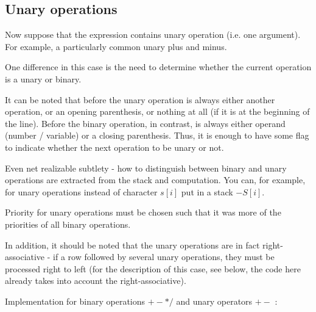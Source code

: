 \subsection{ Unary operations }

Now suppose that the expression contains unary operation (i.e. one argument). For example, a particularly common unary plus and minus.

One difference in this case is the need to determine whether the current operation is a unary or binary.

It can be noted that before the unary operation is always either another operation, or an opening parenthesis, or nothing at all (if it is at the beginning of the line). Before the binary operation, in contrast, is always either operand (number / variable) or a closing parenthesis. Thus, it is enough to have some flag to indicate whether the next operation to be unary or not.

Even net realizable subtlety - how to distinguish between binary and unary operations are extracted from the stack and computation. You can, for example, for unary operations instead of character $s [i]$ put in a stack $-S [i]$.

Priority for unary operations must be chosen such that it was more of the priorities of all binary operations.

In addition, it should be noted that the unary operations are in fact right-associative - if a row followed by several unary operations, they must be processed right to left (for the description of this case, see below, the code here already takes into account the right-associative).

Implementation for binary operations $+ - * /$ and unary operators $+ -$ :

